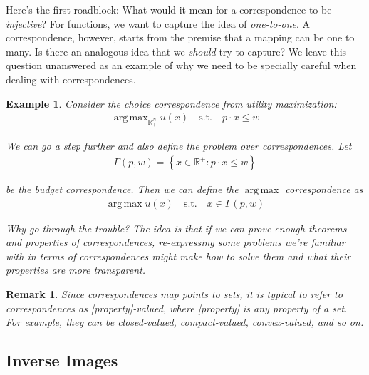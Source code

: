 \documentclass{article}
\DeclareMathOperator*{\argmax}{arg\,max}
\theoremstyle{mythm}
\theoremstyle{mydef}
\newtheorem{remark}{Remark}
\newtheorem{ex}{Example}
\begin{document}
Here's the first roadblock: What would it mean for a correspondence to be \textit{injective}? For functions, we want to capture the idea of \textit{one-to-one}. A correspondence, however, starts from the premise that a mapping can be one to many. Is there an analogous idea that we \textit{should} try to capture? We leave this question unanswered as an example of why we need to be specially careful when dealing with correspondences.

\begin{ex}
  Consider the choice correspondence from utility maximization:
  \begin{align*}
    \argmax_{\mathbb{R}^N_+} u(x)
    \quad
    \text{s.t.}
    \quad
    p \cdot x \le w
  \end{align*}

  We can go a step further and also define the problem over correspondences. Let
  \begin{align*}
    \Gamma(p, w)
    =
    \left\{x \in \mathbb{R}^+: p \cdot x \le w\right\}
  \end{align*}

  be the budget correspondence. Then we can define the $\argmax$ correspondence as
  \begin{align*}
    \argmax u(x)
    \quad
    \text{s.t.}
    \quad
    x \in \Gamma(p, w)
  \end{align*}

  Why go through the trouble? The idea is that if we can prove enough theorems and properties of correspondences, re-expressing some problems we're familiar with in terms of correspondences might make how to solve them and what their properties are more transparent.
\end{ex}

\begin{remark}
  Since correspondences map points to sets, it is typical to refer to correspondences as [property]-valued, where [property] is any property of a set. For example, they can be closed-valued, compact-valued, convex-valued, and so on.
\end{remark}

\subsection{Inverse Images}
\label{ssub:inverse_images}
\end{document}
